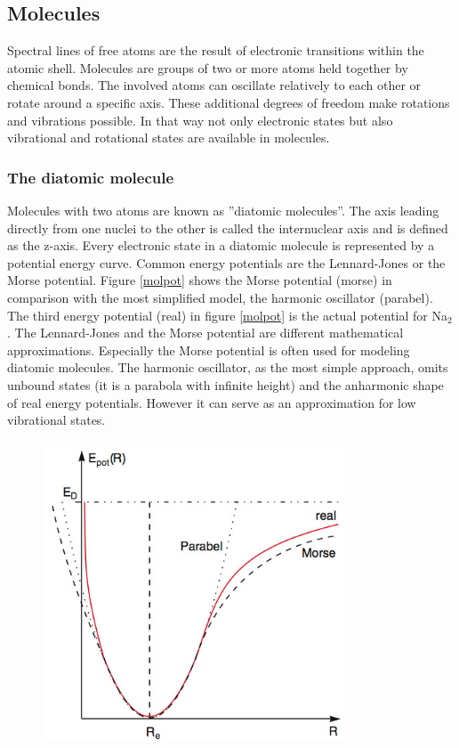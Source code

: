 \documentclass[parskip,12pt,headsepline,a4paper] {scrbook}
\begin{document}
\subsection{Molecules}
\vspace{-1\baselineskip}
Spectral lines of free atoms are the result of electronic transitions within the atomic shell. Molecules are groups of two or more atoms held together by chemical bonds. The involved atoms can oscillate relatively to each other or rotate around a specific axis. These additional degrees of freedom make rotations and vibrations possible. In that way not only electronic states but also vibrational and rotational states are available in molecules. \\

\subsubsection{The diatomic molecule}
\vspace{-1\baselineskip}
Molecules with two atoms are known as ''diatomic molecules''. The axis leading directly from one nuclei to the other is called the internuclear axis and is defined as the z-axis. Every electronic state in a diatomic molecule is represented by a potential energy curve. Common energy potentials are the Lennard-Jones or the Morse potential. Figure \ref{molpot} shows the Morse potential (morse) in comparison with the most simplified model, the harmonic oscillator (parabel). The third energy potential (real) in figure \ref{molpot} is the actual potential for Na$_2$.
The Lennard-Jones and the Morse potential are different mathematical approximations. Especially the Morse potential is often used for modeling diatomic molecules. The harmonic oscillator, as the most simple approach, omits unbound states (it is a parabola with infinite height) and the anharmonic shape of real energy potentials. However it can serve as an approximation for low vibrational states.

\begin{figure}[ht]
\centerline{
\includegraphics[width=9cm]{./spectroscopy/molecular-potential.jpg}}
\end{figure}
\end{document}
